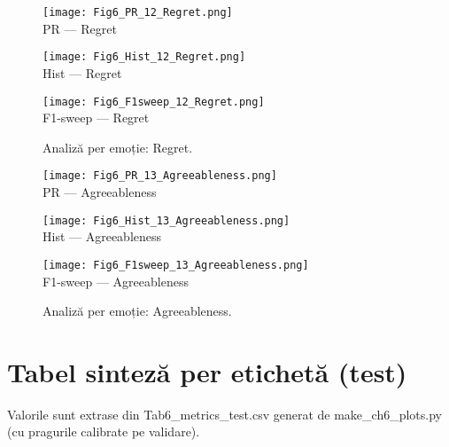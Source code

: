 \begin{figure}[H]
  \centering
  \begin{minipage}[t]{0.32\textwidth}\centering
    \texttt{[image: Fig6\_PR\_12\_Regret.png]}\\[-1mm]
    {\scriptsize PR — Regret}
  \end{minipage}\hfill
  \begin{minipage}[t]{0.32\textwidth}\centering
    \texttt{[image: Fig6\_Hist\_12\_Regret.png]}\\[-1mm]
    {\scriptsize Hist — Regret}
  \end{minipage}\hfill
  \begin{minipage}[t]{0.32\textwidth}\centering
    \texttt{[image: Fig6\_F1sweep\_12\_Regret.png]}\\[-1mm]
    {\scriptsize F1-sweep — Regret}
  \end{minipage}
  \caption{Analiză per emoție: Regret.}
  \label{fig:c6-regret}
\end{figure}

\begin{figure}[H]
  \centering
  \begin{minipage}[t]{0.32\textwidth}\centering
    \texttt{[image: Fig6\_PR\_13\_Agreeableness.png]}\\[-1mm]
    {\scriptsize PR — Agreeableness}
  \end{minipage}\hfill
  \begin{minipage}[t]{0.32\textwidth}\centering
    \texttt{[image: Fig6\_Hist\_13\_Agreeableness.png]}\\[-1mm]
    {\scriptsize Hist — Agreeableness}
  \end{minipage}\hfill
  \begin{minipage}[t]{0.32\textwidth}\centering
    \texttt{[image: Fig6\_F1sweep\_13\_Agreeableness.png]}\\[-1mm]
    {\scriptsize F1-sweep — Agreeableness}
  \end{minipage}
  \caption{Analiză per emoție: Agreeableness.}
  \label{fig:c6-agreeableness}
\end{figure}

\section{Tabel sinteză per etichetă (test)}
Valorile sunt extrase din Tab6\_metrics\_test.csv generat de make\_ch6\_plots.py (cu pragurile calibrate pe validare).

